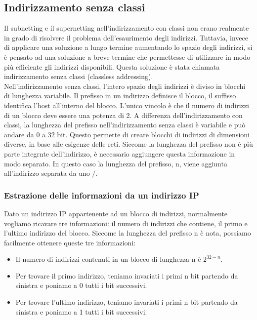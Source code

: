 \documentclass[12pt]{report}
\begin{document}
\subsection{Indirizzamento senza classi}
Il subnetting e il supernetting nell'indirizzamento con classi non erano realmente in grado di risolvere il problema dell'esaurimento degli indirizzi. Tuttavia, invece di applicare una soluzione a lungo termine aumentando lo spazio degli indirizzi, si è pensato ad una soluzione a breve termine che permettesse di utilizzare in modo più efficiente gli indirizzi disponibili. Questa soluzione è stata chiamata indirizzamento senza classi (classless addressing).
\vspace{\baselineskip}\\
Nell'indirizzamento senza classi, l'intero spazio degli indirizzi è diviso in blocchi di lunghezza variabile. Il prefisso in un indirizzo definisce il blocco, il suffisso identifica l'host all'interno del blocco. L'unico vincolo è che il numero di indirizzi di un blocco deve essere una potenza di 2.
A differenza dell'indirizzamento con classi, la lunghezza del prefisso nell'indirizzamento senza classi è variabile e può andare da 0 a 32 bit. Questo permette di creare blocchi di indirizzi di dimensioni diverse, in base alle esigenze delle reti. Siccome la lunghezza del prefisso non è più parte integrnte dell'indirizzo, è necessario aggiungere questa informazione in modo separato. In questo caso la lunghezza del prefisso, n, viene aggiunta all'indirizzo separata da uno $/$.

\subsubsection{Estrazione delle informazioni da un indirizzo IP}
Dato un indirizzo IP appartenente ad un blocco di indirizzi, normalmente vogliamo ricavare tre informazioni: il numero di indirizzi che contiene, il primo e l'ultimo indirizzo del blocco. Siccome la lunghezza del prefisso n è nota, possiamo facilmente ottenere queste tre informazioni:
\begin{itemize}
	\item Il numero di indirizzi contenuti in un blocco di lunghezza n è $2^{32-n}$.
	\item Per trovare il primo indirizzo, teniamo invariati i primi n bit partendo da sinistra e poniamo a 0 tutti i bit successivi.
	\item Per trovare l'ultimo indirizzo, teniamo invariati i primi n bit partendo da sinistra e poniamo a 1 tutti i bit successivi.
\end{itemize}
\end{document}
